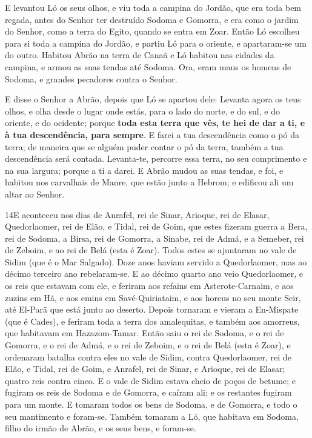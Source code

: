 E levantou Ló os seus olhos, e viu toda a campina do Jordão, que
era toda bem regada, antes do Senhor ter destruído Sodoma e Gomorra,
e era como o jardim do Senhor, como a terra do Egito, quando se
entra em Zoar. Então Ló escolheu para si toda a campina do
Jordão, e partiu Ló para o oriente, e apartaram-se um do outro.
Habitou Abrão na terra de Canaã e Ló habitou nas cidades da
campina, e armou as suas tendas até Sodoma. Ora, eram maus os
homens de Sodoma, e grandes pecadores contra o Senhor.

E disse o Senhor a Abrão, depois que Ló se apartou dele: Levanta
agora os teus olhos, e olha desde o lugar onde estás, para o lado do
norte, e do sul, e do oriente, e do ocidente; porque
\textbf{toda esta terra que vês, te hei de dar a ti, e à tua
descendência, para sempre}. E farei a tua descendência como o
pó da terra; de maneira que se alguém puder contar o pó da terra,
também a tua descendência será contada. Levanta-te, percorre
essa terra, no seu comprimento e na sua largura; porque a ti a
darei. E Abrão mudou as suas tendas, e foi, e habitou nos
carvalhais de Manre, que estão junto a Hebrom; e edificou ali um
altar ao Senhor.

\smallskip

\lettrine{14} E aconteceu nos dias de Anrafel, rei de Sinar,
Arioque, rei de Elasar, Quedorlaomer, rei de Elão, e Tidal, rei de
Goim, que estes fizeram guerra a Bera, rei de Sodoma, a Birsa,
rei de Gomorra, a Sinabe, rei de Admá, e a Semeber, rei de Zeboim, e
ao rei de Belá (esta é Zoar). Todos estes se ajuntaram no vale
de Sidim (que é o Mar Salgado). Doze anos haviam servido a
Quedorlaomer, mas ao décimo terceiro ano rebelaram-se. E ao
décimo quarto ano veio Quedorlaomer, e os reis que estavam com ele,
e feriram aos refains em Asterote-Carnaim, e aos zuzins em Hã, e aos
emins em Savé-Quiriataim, e aos horeus no seu monte Seir, até
El-Parã que está junto ao deserto. Depois tornaram e vieram a
En-Mispate (que é Cades), e feriram toda a terra dos amalequitas, e
também aos amorreus, que habitavam em Hazazom-Tamar. Então saiu
o rei de Sodoma, e o rei de Gomorra, e o rei de Admá, e o rei de
Zeboim, e o rei de Belá (esta é Zoar), e ordenaram batalha contra
eles no vale de Sidim, contra Quedorlaomer, rei de Elão, e
Tidal, rei de Goim, e Anrafel, rei de Sinar, e Arioque, rei de
Elasar; quatro reis contra cinco. E o vale de Sidim estava
cheio de poços de betume; e fugiram os reis de Sodoma e de Gomorra,
e caíram ali; e os restantes fugiram para um monte. E tomaram
todos os bens de Sodoma, e de Gomorra, e todo o seu mantimento e
foram-se. Também tomaram a Ló, que habitava em Sodoma, filho
do irmão de Abrão, e os seus bens, e foram-se.

